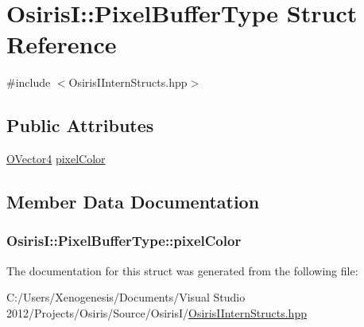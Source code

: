 \hypertarget{struct_osiris_i_1_1_pixel_buffer_type}{\section{Osiris\-I\-:\-:Pixel\-Buffer\-Type Struct Reference}
\label{struct_osiris_i_1_1_pixel_buffer_type}
}


{\ttfamily \#include $<$Osiris\-I\-Intern\-Structs.\-hpp$>$}

\subsection*{Public Attributes}
\begin{DoxyCompactItemize}
\item 
\hyperlink{struct_osiris_i_1_1_o_vector4}{O\-Vector4} \hyperlink{struct_osiris_i_1_1_pixel_buffer_type_a0b800cb80a0c5b49296718830bad18e1}{pixel\-Color}
\end{DoxyCompactItemize}


\subsection{Member Data Documentation}
\hypertarget{struct_osiris_i_1_1_pixel_buffer_type_a0b800cb80a0c5b49296718830bad18e1}{
\subsubsection[{pixel\-Color}]{ Osiris\-I\-::\-Pixel\-Buffer\-Type\-::pixel\-Color}}\label{struct_osiris_i_1_1_pixel_buffer_type_a0b800cb80a0c5b49296718830bad18e1}


The documentation for this struct was generated from the following file\-:\begin{DoxyCompactItemize}
\item 
C\-:/\-Users/\-Xenogenesis/\-Documents/\-Visual Studio 2012/\-Projects/\-Osiris/\-Source/\-Osiris\-I/\hyperlink{_osiris_i_intern_structs_8hpp}{Osiris\-I\-Intern\-Structs.\-hpp}\end{DoxyCompactItemize}
